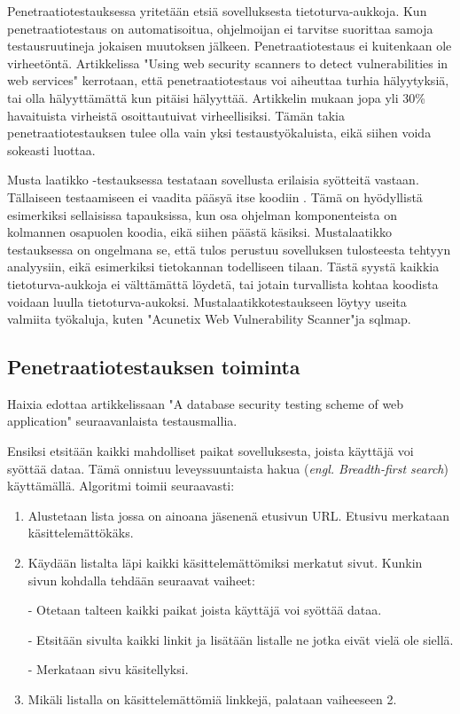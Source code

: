 \documentclass[finnish]{tktltiki2}
\theoremstyle{definition}
\theoremstyle{remark}
\begin{document}
	 Penetraatiotestauksessa yritetään etsiä sovelluksesta tietoturva-aukkoja. Kun penetraatiotestaus on automatisoitua, ohjelmoijan ei tarvitse suorittaa samoja testausruutineja jokaisen muutoksen jälkeen. Penetraatiotestaus ei kuitenkaan ole virheetöntä. Artikkelissa "Using web security scanners to detect vulnerabilities in web services" \cite{detection} kerrotaan, että penetraatiotestaus voi aiheuttaa turhia hälyytyksiä, tai olla hälyyttämättä kun pitäisi hälyyttää. Artikkelin mukaan jopa yli 30\% havaituista virheistä osoittautuivat virheellisiksi. Tämän takia penetraatiotestauksen tulee olla vain yksi testaustyökaluista, eikä siihen voida sokeasti luottaa.
	 
	Musta laatikko -testauksessa testataan sovellusta erilaisia syötteitä vastaan. Tällaiseen testaamiseen ei vaadita pääsyä itse koodiin \cite{testing2}. Tämä on hyödyllistä esimerkiksi sellaisissa tapauksissa, kun osa ohjelman komponenteista on kolmannen osapuolen koodia, eikä siihen päästä käsiksi. Mustalaatikko testauksessa on ongelmana se, että tulos perustuu sovelluksen tulosteesta tehtyyn analyysiin, eikä esimerkiksi tietokannan todelliseen tilaan. Tästä syystä kaikkia tietoturva-aukkoja ei välttämättä löydetä, tai jotain turvallista kohtaa koodista voidaan luulla tietoturva-aukoksi. Mustalaatikkotestaukseen löytyy useita valmiita työkaluja, kuten "Acunetix Web Vulnerability Scanner"\space ja sqlmap.
	
	\subsection{Penetraatiotestauksen toiminta}
	 Haixia edottaa artikkelissaan "A database security testing scheme of web application" \cite{testing} seuraavanlaista testausmallia.
	
	Ensiksi etsitään kaikki mahdolliset paikat sovelluksesta, joista käyttäjä voi syöttää dataa. Tämä onnistuu leveyssuuntaista hakua (\textit{engl. Breadth-first search}) käyttämällä. Algoritmi toimii seuraavasti:
	\begin{enumerate}
		\item Alustetaan lista jossa on ainoana jäsenenä etusivun URL. Etusivu merkataan käsittelemättökäks.
		
		\item Käydään listalta läpi kaikki käsittelemättömiksi merkatut sivut. Kunkin sivun kohdalla tehdään seuraavat vaiheet:
		
		- Otetaan talteen kaikki paikat joista käyttäjä voi syöttää dataa.
		
		- Etsitään sivulta kaikki linkit ja lisätään listalle ne jotka eivät vielä ole siellä.
		
		- Merkataan sivu käsitellyksi.
		
		\item Mikäli listalla on käsittelemättömiä linkkejä, palataan vaiheeseen 2.
	\end{enumerate}
	
\end{document}
